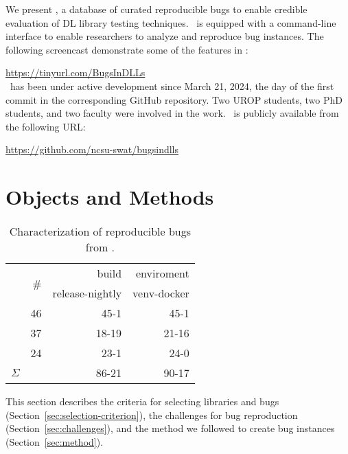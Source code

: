 \documentclass[sigconf,screen]{acmart}
\begin{document}
We present \tname, a database of curated reproducible bugs to
enable credible evaluation of DL library testing techniques. \tname\ is
equipped with a command-line interface to enable researchers to analyze
and reproduce bug instances. The following screencast demonstrate some
of the features in \tname:

\url{https://tinyurl.com/BugsInDLLs}\\

\tname\ has been under active development since March 21, 2024, the
day of the first commit in the corresponding GitHub repository. Two
UROP students, two PhD students, and two faculty were involved in the
work. \tname\ is publicly available from the following URL:

\url{https://github.com/ncsu-swat/bugsindlls}

\section{Objects and Methods}

\begin{table}
  \centering
  \caption{\label{table:bug-characterization}Characterization of
    reproducible bugs from \tname.}
\begin{tabular}{l|rrr}
  \toprule & \multirow{2}{*}{\#} & \multicolumn{1}{r}{build} &
  \multicolumn{1}{r}{enviroment} \\ & & release-nightly & venv-docker
  \\ \cmidrule(lr){2-4} \jax{} & 46 & 45-1 & 45-1 \\ \torch{} & 37 &
  18-19 & 21-16 \\ \tf{} & 24 & 23-1 & 24-0 \\ \midrule
  \multicolumn{1}{c|}{$\Sigma$} & \numbugs{} & 86-21& 90-17
  \\ \bottomrule
\end{tabular}
\end{table}

This section describes the criteria for selecting libraries and bugs
(Section~\ref{sec:selection-criterion}), the challenges for bug
reproduction (Section~\ref{sec:challenges}), and the method we
followed to create bug instances (Section~\ref{sec:method}).
\end{document}
